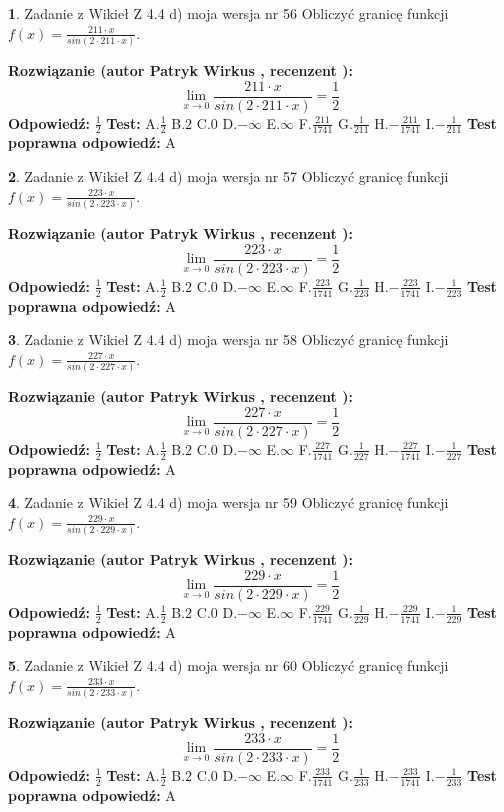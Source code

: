 \documentclass[12pt, a4paper]{article}
\theoremstyle{definition} %
\newtheorem{zad}{}
\newcommand{\zadStart}[1]{\begin{zad}#1\newline}
\newcommand{\zadStop}{\end{zad}}
\newcommand{\rozwStart}[2]{\noindent \textbf{Rozwiązanie (autor #1 , recenzent #2): }\newline}
\newcommand{\rozwStop}{\newline}
\newcommand{\odpStart}{\noindent \textbf{Odpowiedź:}\newline}
\newcommand{\odpStop}{\newline}
\newcommand{\testStart}{\noindent \textbf{Test:}\newline}
\newcommand{\testStop}{\newline}
\newcommand{\kluczStart}{\noindent \textbf{Test poprawna odpowiedź:}\newline}
\newcommand{\kluczStop}{\newline}
\begin{document}
\zadStart{Zadanie z Wikieł Z 4.4 d) moja wersja nr 56}
Obliczyć granicę funkcji $f(x)=\frac{211\cdot x}{sin(2 \cdot211\cdot x)}$.
\zadStop
\rozwStart{Patryk Wirkus}{}
$$\lim\limits_{x\to 0}\frac{211\cdot x}{sin(2 \cdot211\cdot x)}=\frac{1}{2}$$
\rozwStop
\odpStart
$\frac{1}{2}$
\odpStop
\testStart
A.$\frac{1}{2}$
B.$2$
C.$0$
D.$-\infty$
E.$\infty$
F.$\frac{211}{1741}$
G.$\frac{1}{211}$
H.$-\frac{211}{1741}$
I.$-\frac{1}{211}$
\testStop
\kluczStart
A
\kluczStop



\zadStart{Zadanie z Wikieł Z 4.4 d) moja wersja nr 57}
Obliczyć granicę funkcji $f(x)=\frac{223\cdot x}{sin(2 \cdot223\cdot x)}$.
\zadStop
\rozwStart{Patryk Wirkus}{}
$$\lim\limits_{x\to 0}\frac{223\cdot x}{sin(2 \cdot223\cdot x)}=\frac{1}{2}$$
\rozwStop
\odpStart
$\frac{1}{2}$
\odpStop
\testStart
A.$\frac{1}{2}$
B.$2$
C.$0$
D.$-\infty$
E.$\infty$
F.$\frac{223}{1741}$
G.$\frac{1}{223}$
H.$-\frac{223}{1741}$
I.$-\frac{1}{223}$
\testStop
\kluczStart
A
\kluczStop



\zadStart{Zadanie z Wikieł Z 4.4 d) moja wersja nr 58}
Obliczyć granicę funkcji $f(x)=\frac{227\cdot x}{sin(2 \cdot227\cdot x)}$.
\zadStop
\rozwStart{Patryk Wirkus}{}
$$\lim\limits_{x\to 0}\frac{227\cdot x}{sin(2 \cdot227\cdot x)}=\frac{1}{2}$$
\rozwStop
\odpStart
$\frac{1}{2}$
\odpStop
\testStart
A.$\frac{1}{2}$
B.$2$
C.$0$
D.$-\infty$
E.$\infty$
F.$\frac{227}{1741}$
G.$\frac{1}{227}$
H.$-\frac{227}{1741}$
I.$-\frac{1}{227}$
\testStop
\kluczStart
A
\kluczStop



\zadStart{Zadanie z Wikieł Z 4.4 d) moja wersja nr 59}
Obliczyć granicę funkcji $f(x)=\frac{229\cdot x}{sin(2 \cdot229\cdot x)}$.
\zadStop
\rozwStart{Patryk Wirkus}{}
$$\lim\limits_{x\to 0}\frac{229\cdot x}{sin(2 \cdot229\cdot x)}=\frac{1}{2}$$
\rozwStop
\odpStart
$\frac{1}{2}$
\odpStop
\testStart
A.$\frac{1}{2}$
B.$2$
C.$0$
D.$-\infty$
E.$\infty$
F.$\frac{229}{1741}$
G.$\frac{1}{229}$
H.$-\frac{229}{1741}$
I.$-\frac{1}{229}$
\testStop
\kluczStart
A
\kluczStop



\zadStart{Zadanie z Wikieł Z 4.4 d) moja wersja nr 60}
Obliczyć granicę funkcji $f(x)=\frac{233\cdot x}{sin(2 \cdot233\cdot x)}$.
\zadStop
\rozwStart{Patryk Wirkus}{}
$$\lim\limits_{x\to 0}\frac{233\cdot x}{sin(2 \cdot233\cdot x)}=\frac{1}{2}$$
\rozwStop
\odpStart
$\frac{1}{2}$
\odpStop
\testStart
A.$\frac{1}{2}$
B.$2$
C.$0$
D.$-\infty$
E.$\infty$
F.$\frac{233}{1741}$
G.$\frac{1}{233}$
H.$-\frac{233}{1741}$
I.$-\frac{1}{233}$
\testStop
\kluczStart
A
\kluczStop
\end{document}
